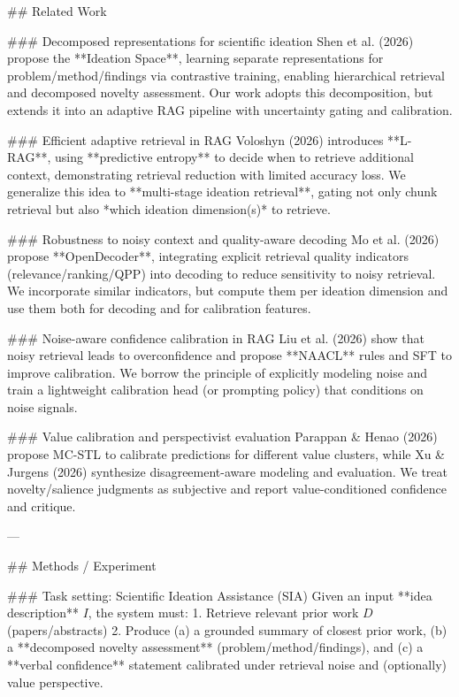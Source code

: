 ## Related Work  

### Decomposed representations for scientific ideation  
Shen et al. (2026) propose the **Ideation Space**, learning separate representations for problem/method/findings via contrastive training, enabling hierarchical retrieval and decomposed novelty assessment. Our work adopts this decomposition, but extends it into an adaptive RAG pipeline with uncertainty gating and calibration.

### Efficient adaptive retrieval in RAG  
Voloshyn (2026) introduces **L-RAG**, using **predictive entropy** to decide when to retrieve additional context, demonstrating retrieval reduction with limited accuracy loss. We generalize this idea to **multi-stage ideation retrieval**, gating not only chunk retrieval but also *which ideation dimension(s)* to retrieve.

### Robustness to noisy context and quality-aware decoding  
Mo et al. (2026) propose **OpenDecoder**, integrating explicit retrieval quality indicators (relevance/ranking/QPP) into decoding to reduce sensitivity to noisy retrieval. We incorporate similar indicators, but compute them per ideation dimension and use them both for decoding and for calibration features.

### Noise-aware confidence calibration in RAG  
Liu et al. (2026) show that noisy retrieval leads to overconfidence and propose **NAACL** rules and SFT to improve calibration. We borrow the principle of explicitly modeling noise and train a lightweight calibration head (or prompting policy) that conditions on noise signals.

### Value calibration and perspectivist evaluation  
Parappan & Henao (2026) propose MC-STL to calibrate predictions for different value clusters, while Xu & Jurgens (2026) synthesize disagreement-aware modeling and evaluation. We treat novelty/salience judgments as subjective and report value-conditioned confidence and critique.

---

## Methods / Experiment  

### Task setting: Scientific Ideation Assistance (SIA)  
Given an input **idea description** \(I\), the system must:  
1. Retrieve relevant prior work \(D\) (papers/abstracts)  
2. Produce (a) a grounded summary of closest prior work, (b) a **decomposed novelty assessment** (problem/method/findings), and (c) a **verbal confidence** statement calibrated under retrieval noise and (optionally) value perspective.

